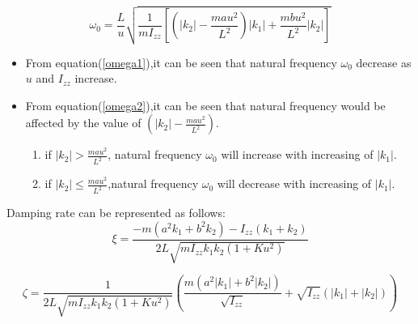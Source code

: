 \documentclass[UTF8,a4paper,11pt]{article}
\begin{document}
\begin{equation}\label{omega2}
\omega_{0}=\frac{L}{u} \sqrt{\frac{1}{m I_{z z}}\left[\left(\left|k_{2}\right|-\frac{m a u^{2}}{L^{2}}\right)\left|k_{1}\right|+\frac{m b u^{2}}{L^{2}}\left|k_{2}\right|\right]}
\end{equation}
\begin{itemize}
\item From equation(\ref{omega1}),it can be seen that natural frequency $\omega_0$ decrease as $u$ and $I_{zz}$ increase.
\item From equation(\ref{omega2}),it can be seen that natural frequency would be affected by the value of $\left(\left|k_{2}\right|-\frac{m a u^{2}}{L^{2}}\right)$. 
	\begin{enumerate}
	\item if $|k_2| > \frac{mau^2}{L^2}$, natural frequency $\omega_0$ will increase with increasing of $|k_1|$.
	\item if $|k_2| \le \frac{mau^2}{L^2}$,natural frequency $\omega_0$ will decrease with increasing of $|k_1|$.
	\end{enumerate}
\end{itemize}

Damping rate can be represented as follows:
\begin{equation}\label{zeta1}
\xi=\frac{-m\left(a^{2} k_{1}+b^{2} k_{2}\right)-I_{z z}\left(k_{1}+k_{2}\right)}{2 L \sqrt{m I_{z z} k_{1} k_{2}\left(1+K u^{2}\right)}}
\end{equation}

\begin{equation}\label{zeta2}
\zeta =\frac{1}{2 L \sqrt{m I_{z z} k_{1} k_{2}\left(1+K u^{2}\right)}}\left(\frac{m\left(a^{2}\left|k_{1}\right|+b^{2}\left|k_{2}\right|\right)}{\sqrt{I_{z z}}}+\sqrt{I_{z z}}\left(\left|k_{1}\right|+\left|k_{2}\right|\right)\right)
\end{equation}
\end{document}

